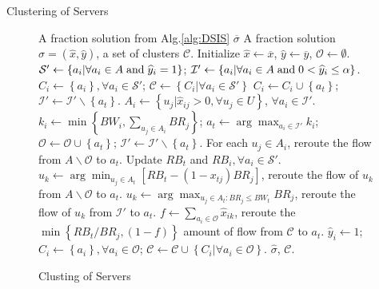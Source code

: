 \documentclass[11pt,a4paper]{article}
\begin{document}
Clustering of Servers
\begin{figure}[!t]
	\renewcommand{\algorithmicrequire}{\textbf{Input:}}
	\renewcommand{\algorithmicensure}{\textbf{Output:}}
	\begin{algorithm}[H]
		\caption{Clusting of Servers}
		\begin{algorithmic}[1]\label{alg:CoS}
			\REQUIRE A fraction solution from Alg.\ref{alg:DSIS} $\overline{\sigma}$
			\ENSURE A fraction solution $\widehat \sigma = ({\widehat x},{\widehat y})$, a set of clusters $\mathcal{C}$.
			\STATE Initialize $\widehat x \leftarrow \overline x$, $\widehat y \leftarrow \overline y$, $\mathcal{O} \leftarrow \emptyset$.
			\STATE ${\mathcal{S}'} \leftarrow \left\{ {{a_i}|\forall{a_i} \in A\; {\rm{and}} \; {{\widehat y}_i} = 1} \right\}$; ${\mathcal{I}'} \leftarrow \left\{ {{a_i}|\forall{a_i} \in A\; {\rm{and}} \; 0<{{\widehat y}_i} \le \alpha} \right\}$.
			\STATE  $C_i \leftarrow \left\{a_i\right\}, \forall a_i \in \mathcal{S}'$; $\mathcal{C} \leftarrow \left\{C_i| \forall a_i\in \mathcal{S}'\right\}$
			\STATE $C_i \leftarrow C_i \cup \left\{a_t\right\}$; $\mathcal{I}' \leftarrow \mathcal{I}' \backslash \left\{a_t\right\}$.
			\ENDIF
			\ENDFOR
			\STATE $A_i \leftarrow \left\{u_j| \widehat{x}_{ij} > 0, \forall u_j \in U \right\}$, $\forall a_i \in \mathcal{I}'$.
			\STATE $k_i \leftarrow \min \left\{BW_i, \sum\nolimits_{{u_j} \in A_i} {{BR_j}} \right\}$; $a_t \leftarrow \arg\max_{a_i \in \mathcal{I}'}{k_i}$; $\mathcal{O} \leftarrow  \mathcal{O} \cup \left\{a_t\right\}$; $\mathcal{I}' \leftarrow \mathcal{I}' \backslash \left\{a_t\right\}$.
			\STATE For each $u_j \in A_i$, reroute the flow from $A \backslash \mathcal{O}$ to $a_t$.
			\STATE Update $RB_t$ and $RB_i, \forall a_i \in \mathcal{S}'$.
			\ENDIF
			\STATE $u_k \leftarrow \arg\min_{u_j \in A_t}\left[RB_t - (1-x_{tj})BR_j\right]$, reroute the flow of $u_k$ from $A \backslash \mathcal{O}$ to $a_t$.
			\ENDWHILE
			\ENDIF
			\STATE $u_k \leftarrow \arg\max_{u_j \in A_t : BR_j \le BW_t}BR_j$, reroute the flow of $u_k$ from $\mathcal{I}'$ to $a_t$.
			\STATE $f \leftarrow \sum\nolimits_{{a_i} \in \mathcal{O}} {{{\widehat x}_{ik}}} $, reroute the $\min \left\{RB_t/BR_j, (1-f)\right\}$ amount of flow from $\mathcal{C}$ to $a_t$.
			\ENDIF
			\ENDIF
			\ENDWHILE
			\STATE $\widehat y_i \leftarrow 1$; $ C_i \leftarrow \left\{a_i\right\}, \forall a_i \in \mathcal{O} $; $\mathcal{C} \leftarrow \mathcal{C} \cup \left\{C_i|\forall a_i \in \mathcal{O} \right\}$. 
			\RETURN $\widehat{\sigma}$, $\mathcal{C}$.
		\end{algorithmic}
	\end{algorithm}
\end{figure}
\end{document}
